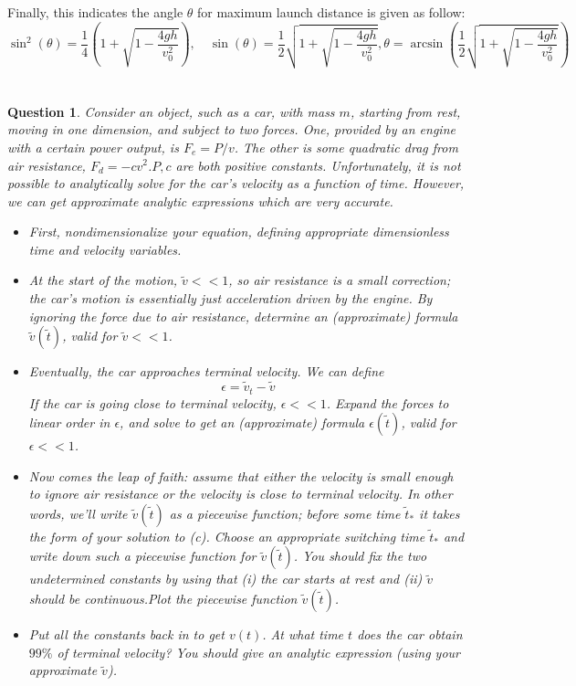 \documentclass{article}
\newtheorem{question}{Question}
\begin{document}
Finally, this indicates the angle $\theta$ for maximum launch distance is given as follow:
$$\sin^2(\theta)=\frac{1}{4}\left(1+\sqrt{1-\frac{4gh}{v_0^2}}\right),\quad \sin(\theta)=\frac{1}{2}\sqrt{1+\sqrt{1-\frac{4gh}{v_0^2}}}, \theta = \arcsin\left(\frac{1}{2}\sqrt{1+\sqrt{1-\frac{4gh}{v_0^2}}}\right)$$

\break

\section{}%
\begin{question}\label{q3}
    Consider an object, such as a car, with mass $m$, starting from rest, moving in one dimension, and subject to two forces. One, provided by an engine with a certain power output, is $F_e = P/v$. The other is some quadratic drag from air resistance, $F_d = -cv^2$.$P,c$ are both positive constants. Unfortunately, it is not possible to analytically solve for the car's velocity as a function of time. However, we can get approximate analytic expressions which are very accurate.
    \begin{itemize}
        \item[(a)] First, nondimensionalize your equation, defining appropriate dimensionless time and velocity variables.
        \item[(b)] At the start of the motion, $\tilde{v}<< 1$, so air resistance is a small correction; the car's motion is essentially just acceleration driven by the engine. By ignoring the force due to air resistance, determine an (approximate) formula $\tilde{v}(\tilde{t})$, valid for $\tilde{v}<<1$.
        \item[(c)]Eventually, the car approaches terminal velocity. We can define 
        $$\epsilon = \tilde{v}_t-\tilde{v}$$
        If the car is going close to terminal velocity, $\epsilon <<1$. Expand the forces to linear order in $\epsilon$, and solve to get an (approximate) formula $\epsilon(\tilde{t})$, valid for $\epsilon<<1$.
        \item[(d)] Now comes the leap of faith: assume that either the velocity is small enough to ignore air resistance or the velocity is close to terminal velocity. In other words, we'll write $\tilde{v}(\tilde{t})$ as a piecewise function; before some time $\tilde{t}_*$ it takes the form of your solution to (c). Choose an appropriate switching time $\tilde{t}_*$ and write down such a piecewise function for $\tilde{v}(\tilde{t})$. You should fix the two undetermined constants by using that (i) the car starts at rest and (ii) $\tilde{v}$ should be continuous.Plot the piecewise function $\tilde{v}(\tilde{t})$.
        \item[(e)] Put all the constants back in to get $v(t)$. At what time $t$ does the car obtain $99\%$ of terminal velocity? You should give an analytic expression (using your approximate $\tilde{v}$). 
    \end{itemize}
\end{question}
\end{document}
